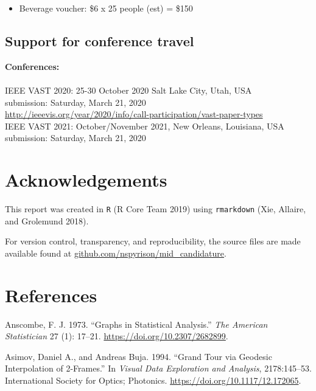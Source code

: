 \documentclass[
  11,
]{article}
\providecommand{\tightlist}{%
  \setlength{\itemsep}{0pt}\setlength{\parskip}{0pt}}
\begin{document}
\begin{itemize}
\tightlist
\item
  Beverage voucher: \$6 x 25 people (est) = \$150
\end{itemize}

\hypertarget{support-for-conference-travel}{%
\subsection{Support for conference travel}\label{support-for-conference-travel}}

\textbf{Conferences:}\\
~\\
IEEE VAST 2020: 25-30 October 2020 Salt Lake City, Utah, USA\\
submission: Saturday, March 21, 2020\\
\url{http://ieeevis.org/year/2020/info/call-participation/vast-paper-types}~\\
IEEE VAST 2021: October/November 2021, New Orleans, Louisiana, USA\\
submission: Saturday, March 21, 2020\\

\hypertarget{sec:acknowledgements}{%
\section{Acknowledgements}\label{sec:acknowledgements}}

This report was created in \texttt{R} (R Core Team 2019) using \texttt{rmarkdown} (Xie, Allaire, and Grolemund 2018).

For version control, transparency, and reproducibility, the source files are made available found at \href{https://github.com/nspyrison/mid_candidature}{github.com/nspyrison/mid\_candidature}.

\hypertarget{references}{%
\section*{References}\label{references}}

\hypertarget{refs}{}
\leavevmode\hypertarget{ref-anscombe_graphs_1973}{}%
Anscombe, F. J. 1973. ``Graphs in Statistical Analysis.'' \emph{The American Statistician} 27 (1): 17--21. \url{https://doi.org/10.2307/2682899}.

\leavevmode\hypertarget{ref-asimov_grand_1994}{}%
Asimov, Daniel A., and Andreas Buja. 1994. ``Grand Tour via Geodesic Interpolation of 2-Frames.'' In \emph{Visual Data Exploration and Analysis}, 2178:145--53. International Society for Optics; Photonics. \url{https://doi.org/10.1117/12.172065}.
\end{document}
